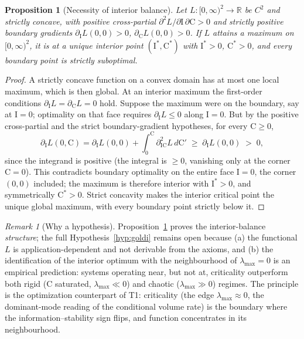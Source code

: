 \documentclass[11pt]{article}
\theoremstyle{plain}
\newtheorem{proposition}[theorem]{Proposition}
\theoremstyle{definition}
\theoremstyle{remark}
\newtheorem{remark}[theorem]{Remark}
\newcommand{\R}{\mathbb{R}}
\begin{document}
\begin{proposition}[Necessity of interior balance]\label{prop:goldi}
Let $L:[0,\infty)^2\to\R$ be $C^2$ and strictly concave, with positive cross-partial $\partial^2 L/\partial\mathrm I\,\partial\mathrm C>0$ and strictly positive boundary gradients $\partial_{\mathrm I}L(0,0)>0$, $\partial_{\mathrm C}L(0,0)>0$. If $L$ attains a maximum on $[0,\infty)^2$, it is at a unique interior point $(\mathrm I^*,\mathrm C^*)$ with $\mathrm I^*>0$, $\mathrm C^*>0$, and every boundary point is strictly suboptimal.
\end{proposition}
\begin{proof}
A strictly concave function on a convex domain has at most one local maximum, which is then global. At an interior maximum the first-order conditions $\partial_{\mathrm I}L=\partial_{\mathrm C}L=0$ hold. Suppose the maximum were on the boundary, say at $\mathrm I=0$; optimality on that face requires $\partial_{\mathrm I}L\le0$ along $\mathrm I=0$. But by the positive cross-partial and the strict boundary-gradient hypotheses, for every $\mathrm C\ge0$,
\[
\partial_{\mathrm I}L(0,\mathrm C)=\partial_{\mathrm I}L(0,0)+\int_0^{\mathrm C}\partial^2_{\mathrm I\mathrm C}L\,d\mathrm C'\;\ge\;\partial_{\mathrm I}L(0,0)\;>\;0,
\]
since the integrand is positive (the integral is $\ge0$, vanishing only at the corner $\mathrm C=0$). This contradicts boundary optimality on the entire face $\mathrm I=0$, the corner $(0,0)$ included; the maximum is therefore interior with $\mathrm I^*>0$, and symmetrically $\mathrm C^*>0$. Strict concavity makes the interior critical point the unique global maximum, with every boundary point strictly below it.
\end{proof}

\begin{remark}[Why a hypothesis]
Proposition~\ref{prop:goldi} proves the interior-balance \emph{structure}; the full Hypothesis~\ref{hyp:goldi} remains open because (a) the functional $L$ is application-dependent and not derivable from the axioms, and (b) the identification of the interior optimum with the neighbourhood of $\lambda_{\max}=0$ is an empirical prediction: systems operating near, but not at, criticality outperform both rigid ($\mathrm C$ saturated, $\lambda_{\max}\ll0$) and chaotic ($\lambda_{\max}\gg0$) regimes. The principle is the optimization counterpart of T1: criticality (the edge $\lambda_{\max}\approx0$, the dominant-mode reading of the conditional volume rate) is the boundary where the information--stability sign flips, and function concentrates in its neighbourhood.
\end{remark}
\end{document}
